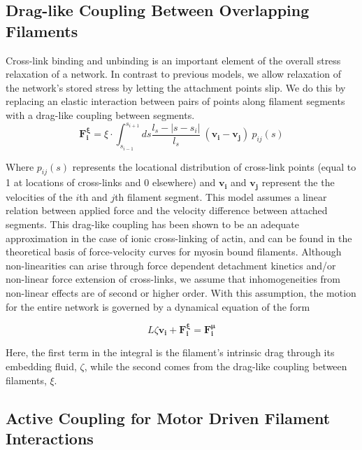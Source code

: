 \documentclass[10pt,letterpaper]{article}
\begin{document}
\subsection*{Drag-like Coupling Between Overlapping Filaments}
\label{exp_drag}
Cross-link binding and unbinding is an important element of the overall stress relaxation of a network.  In contrast to previous models, we allow relaxation of the network's stored stress by letting the attachment points slip.  We do this by replacing an elastic interaction between pairs of points along filament segments with a drag-like coupling between segments.
\begin{equation}
\mathbf{F^{\xi}_i} = \xi \cdot \int^{s_{i+1}}_{s_{i-1}} ds \frac{l_s-|s-s_i|}{l_s} \: (\mathbf{v_i}-\mathbf{v_j}) \: p_{ij}(s)
\end{equation}

Where $p_{ij}(s)$ represents the locational distribution of cross-link points (equal to 1 at locations of cross-links and 0 elsewhere) and $\mathbf{v_i}$ and $\mathbf{v_j}$ represent the the velocities of the $i$th and $j$th filament segment.  This model assumes a linear relation between applied force and the velocity difference between attached segments.  This drag-like coupling has been shown to be an adequate approximation in the case of ionic cross-linking of actin\cite{mol_fric,theo_hydroish2}, and can be found in the theoretical basis of force-velocity curves for myosin bound filaments\cite{theo_frictionShila}. Although non-linearities can arise through force dependent detachment kinetics and/or non-linear force extension of cross-links, we assume that inhomogeneities from non-linear effects are of second or higher order. With this assumption, the motion for the entire network is governed by a dynamical equation of the form

\begin{equation}
\label{eqn:syst}
L\zeta\mathbf{ v_i} +\mathbf{F^{\xi}_i}= \mathbf{F^{\mu}_i}
\end{equation}

Here, the first term in the integral is the filament's intrinsic drag through its embedding fluid, $\zeta$, while the second comes from the drag-like coupling between filaments, $\xi$.  

\subsection*{Active Coupling for Motor Driven Filament Interactions}
\end{document}

